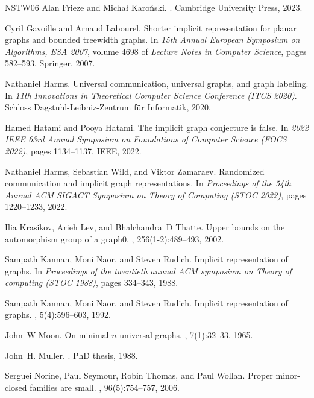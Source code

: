 \documentclass[letterpaper,11pt]{article}
\theoremstyle{definition}
\theoremstyle{remark}
\begin{document}
\begin{thebibliography}{NSTW06}
Alan Frieze and Michał Karoński.
.
\newblock Cambridge University Press, 2023.

Cyril Gavoille and Arnaud Labourel.
\newblock Shorter implicit representation for planar graphs and bounded
  treewidth graphs.
\newblock In {\em 15th Annual European Symposium on Algorithms, {ESA} 2007},
  volume 4698 of {\em Lecture Notes in Computer Science}, pages 582--593.
  Springer, 2007.

Nathaniel Harms.
\newblock Universal communication, universal graphs, and graph labeling.
\newblock In {\em 11th Innovations in Theoretical Computer Science Conference
  (ITCS 2020)}. Schloss Dagstuhl-Leibniz-Zentrum f{\"u}r Informatik, 2020.

Hamed Hatami and Pooya Hatami.
\newblock The implicit graph conjecture is false.
\newblock In {\em 2022 IEEE 63rd Annual Symposium on Foundations of Computer
  Science (FOCS 2022)}, pages 1134--1137. IEEE, 2022.

Nathaniel Harms, Sebastian Wild, and Viktor Zamaraev.
\newblock Randomized communication and implicit graph representations.
\newblock In {\em Proceedings of the 54th Annual ACM SIGACT Symposium on Theory
  of Computing (STOC 2022)}, pages 1220--1233, 2022.

Ilia Krasikov, Arieh Lev, and Bhalchandra~D Thatte.
\newblock Upper bounds on the automorphism group of a graph0.
, 256(1-2):489--493, 2002.

Sampath Kannan, Moni Naor, and Steven Rudich.
\newblock Implicit representation of graphs.
\newblock In {\em Proceedings of the twentieth annual ACM symposium on Theory
  of computing (STOC 1988)}, pages 334--343, 1988.

Sampath Kannan, Moni Naor, and Steven Rudich.
\newblock Implicit representation of graphs.
, 5(4):596--603, 1992.

John~W Moon.
\newblock On minimal $n$-universal graphs.
, 7(1):32--33, 1965.

John~H. Muller.
.
\newblock PhD thesis, 1988.

Serguei Norine, Paul Seymour, Robin Thomas, and Paul Wollan.
\newblock Proper minor-closed families are small.
, 96(5):754--757,
  2006.


\end{thebibliography}
\end{document}
